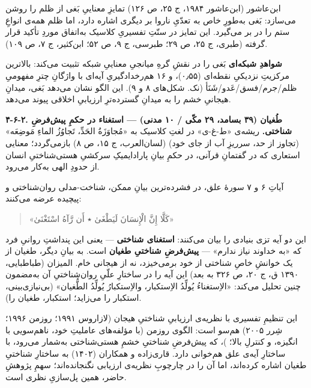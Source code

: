 \begin{RTL}
\begin{otherlanguage}{persian}
ابن‌عاشور (ابن‌عاشور ۱۹۸۴، ج ۲۵، ص ۱۲۶) تمایزِ معناییِ بَغی از ظلم را روشن
می‌سازد: بَغی به‌طورِ خاص به تعدّیِ ناروا بر دیگری اشاره دارد، اما ظلم همه‌ی
انواعِ ستم را در بر می‌گیرد. این تمایز در سنّتِ تفسیریِ کلاسیک به‌اتفاق موردِ
تأکید قرار گرفته (طبری، ج ۲۵، ص ۲۹؛ طبرسی، ج ۹، ص ۵۲؛ ابن‌کثیر، ج ۷، ص
۱۰۹).

\textbf{شواهدِ شبکه‌ای} بَغی را در نقشِ گرهِ میانجیِ معناییِ شبکه تثبیت می‌کند:
بالاترین مرکزیتِ نزدیکیِ نقطه‌ای (۰٫۵۵)، و ۱۶ هم‌رخدادگیریِ آیه‌ای با واژگانِ
چترِ مفهومیِ ظلم/جرم/فسق/عَدو/شَنَأ (نک. شکل‌های ۸ و ۹). این الگو نشان می‌دهد
بَغی، میدانِ هیجانیِ خشم را به میدانِ گسترده‌ترِ ارزیابیِ اخلاقی پیوند می‌دهد.

\textbf{۴-۶-۲. طُغیان (۳۹ بسامد، ۲۹ مکّی / ۱۰ مدنی) --- استغناء در حکمِ
پیش‌فرضِ شناختی.} ریشه‌ی «ط-غ-ی» در لغتِ کلاسیک به «مُجاوَزَةُ الحَدِّ، تَجاوُزُ الماءِ
مَوضِعَه» (تجاوز از حد، سرریزِ آب از جای خود) (لسان‌العرب، ج ۱۵، ص ۸)
بازمی‌گردد؛ معنایی استعاری که در گفتمانِ قرآنی، در حکمِ بیانِ پارادایمیکِ
سرکشیِ هستی‌شناختیِ انسان از حدودِ الهی به‌کار می‌رود.

آیاتِ ۶ و ۷ سورۀ علق، در فشرده‌ترین بیانِ ممکن، شناخت-مدلی روان‌شناختی و
پیچیده عرضه می‌کنند:

\begin{quote}
«كَلَّا إِنَّ الْإِنسَانَ لَيَطْغَىٰ ٭ أَن رَّآهُ اسْتَغْنَىٰ»
\end{quote}

این دو آیه تزی بنیادی را بیان می‌کنند: \textbf{استغنای شناختی} --- یعنی
این پنداشتِ روانیِ فرد که «به خداوند نیاز ندارم» --- \textbf{پیش‌فرضِ شناختیِ
طغیان} است. به بیانِ دیگر، طغیان از یک خوانشِ خاصِ شناختی از خود برمی‌خیزد،
نه از هیجانی خام. المیزان (طباطبایی، ۱۳۹۰ ق، ج ۲۰، ص ۳۲۶ به بعد) این آیه
را در ساختارِ علّیِ روان‌شناختیِ آن به‌مضمون چنین تحلیل می‌کند: «الاِستغناءُ یُولِّدُ
الاِستکبار، والاِستکبارُ یُولِّدُ الطُّغیان» (بی‌نیازی‌بینی، استکبار را می‌زاید؛
استکبار، طغیان را).

این تنظیمِ تفسیری با نظریه‌ی ارزیابیِ شناختیِ هیجان (لازاروس ۱۹۹۱؛ روزمن
۱۹۹۶؛ شِرر ۲۰۰۵) هم‌سو است: الگوی روزمن (با مؤلفه‌های عاملیتِ خود، ناهم‌سویی
با انگیزه، و کنترلِ بالا؛
)، که پیش‌فرضِ شناختیِ
خشمِ هستی‌شناختی به‌شمار می‌رود، با ساختارِ آیه‌ی علق هم‌خوانی دارد. قاری‌زاده و
همکاران (۱۴۰۲) به ساختارِ شناختیِ طغیان اشاره کرده‌اند، اما آن را در چارچوبِ
نظریه‌ی ارزیابی نگنجانده‌اند؛ سهمِ پژوهشِ حاضر، همین پل‌سازیِ نظری است.


\end{otherlanguage}
\end{RTL}
